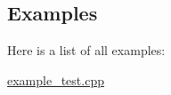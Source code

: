 \subsection{Examples}
Here is a list of all examples\+:\begin{DoxyCompactItemize}
\item 
\mbox{\hyperlink{example_test_8cpp-example}{example\+\_\+test.\+cpp}}
\end{DoxyCompactItemize}

